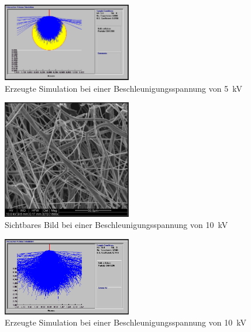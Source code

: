 \documentclass[12pt,english,ngerman]{scrartcl}
\begin{document}
\begin{figure}[H]
	\begin{center}
		\includegraphics[width =0.5\textwidth]{./figures/simulation5kv.png}
	\end{center}
	\caption{Erzeugte Simulation bei einer Beschleunigungsspannung von \SI{5}{\kilo\volt}}
    \label{fig:simulation5kv}
\end{figure}


\begin{figure}[H]
	\begin{center}
		\includegraphics[width =0.5\textwidth]{./figures/10kv.png}
	\end{center}
	\caption{Sichtbares Bild bei einer Beschleunigungsspannung von \SI{10}{\kilo\volt} \cite{sein_foto}}
    \label{fig:10kv}
\end{figure}

\begin{figure}[H]
	\begin{center}
		\includegraphics[width =0.5\textwidth]{./figures/simulation10kv.png}
	\end{center}
	\caption{Erzeugte Simulation bei einer Beschleunigungsspannung von \SI{10}{\kilo\volt} \cite{sein_foto}}
    \label{fig:simulation10kv}
\end{figure}
\end{document}
